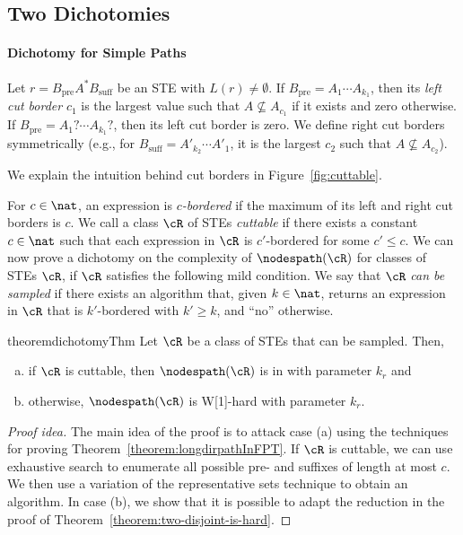 \documentclass[a4paper,english]{lipics-v2016}
\theoremstyle{plain}
\begin{document}
\subsection{Two Dichotomies}\label{sec:twodichotomies}

\paragraph*{Dichotomy for Simple Paths}

\begin{definition} 
Let $r = B_\text{pre} A^* B_\text{suff}$
be an STE with $L(r)\neq \emptyset$. 
If $B_\text{pre} = A_1 \cdots A_{k_1} $, then its
\emph{left cut border} 
$c_1$
is the largest value such that $A \not \subseteq
A_{c_1}$
if it exists and zero otherwise. If $B_\text{pre} = A_1? \cdots
A_{k_1}?$, 
then its left cut border is zero. 
We define right cut borders symmetrically (e.g., for
$B_\text{suff} = A'_{k_2} \cdots A'_1$, it is the largest 
$c_2$ such that $A \not \subseteq A_{c_2}$).
\end{definition}
We explain the intuition behind cut borders in Figure~\ref{fig:cuttable}.


For $c \in \nat$, an expression is \emph{$c$-bordered} if the maximum
of its left and right cut borders is $c$. We call a class $\cR$
of STEs \emph{cuttable} if there exists a constant $c \in \nat$ such
that each expression in $\cR$ is $c'$-bordered for some $c' \leq c$.
We can now prove a dichotomy on the complexity of $\nodespath(\cR)$ for
classes of STEs $\cR$, if $\cR$ satisfies the following mild
condition. We say that $\cR$ \emph{can be sampled} if there exists
an 
algorithm that, given $k \in \nat$, returns an 
expression in $\cR$ that is $k'$-bordered with $k' \geq k$, and ``no'' otherwise.


\begin{restatable}{theorem}{dichotomyThm}\label{theo:dichotomy}
  Let $\cR$ be a class of STEs that can be sampled. Then,
  \begin{enumerate}[(a)]
  \item if $\cR$ is cuttable, then $\nodespath(\cR)$ is in \fpt with
    parameter $k_r$ and
  \item otherwise, $\nodespath(\cR)$ is W[1]-hard with
    parameter $k_r$. 
 \end{enumerate}
\end{restatable}
\begin{proof}[Proof idea]
  The main idea of the proof is to attack case (a) using the
  techniques for proving
  Theorem~\ref{theorem:longdirpathInFPT}. If $\cR$ is cuttable, we can
  use exhaustive search to enumerate all possible pre- and suffixes of
  length at most $c$. We then use a variation of the representative
  sets technique \cite{fomin} to obtain an \fpt algorithm.  In case
  (b), we show that it is possible to adapt the reduction in the proof
  of Theorem~\ref{theorem:two-disjoint-is-hard}.
\end{proof}
\end{document}
